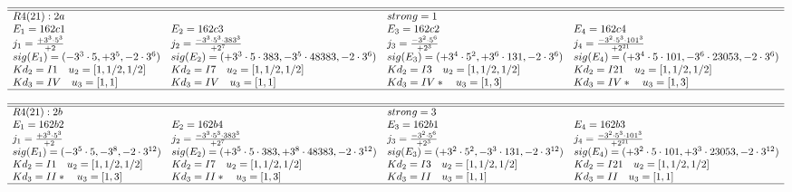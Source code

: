 \documentclass[11pt]{article}
\theoremstyle{definition}
\begin{document}
$$
 \begin{array}{llll}
 \hline 
\hline 
  R4(21):2a  &   & strong=1\\
 E_1=162c1 & E_2=162c3 & E_3=162c2 & E_4=162c4 \\
 j_1=\frac{+3^{3}\cdot 5^{3}}{+2} & j_2=\frac{-3^{3}\cdot 5^{3}\cdot 383^{3}}{+2^{7}} & j_3=\frac{-3^{2}\cdot 5^{6}}{+2^{3}} & j_4=\frac{-3^{2}\cdot 5^{3}\cdot 101^{3}}{+2^{21}} \\
 sig(E_1)=(-3^{3}\cdot 5,+3^{5},-2\cdot 3^{6}) & sig(E_2)=(+3^{3}\cdot 5\cdot 383,-3^{5}\cdot 48383,-2\cdot 3^{6}) & sig(E_3)=(+3^{4}\cdot 5^{2},+3^{6}\cdot 131,-2\cdot 3^{6}) & sig(E_4)=(+3^{4}\cdot 5\cdot 101,-3^{6}\cdot 23053,-2\cdot 3^{6}) \\
  Kd_{2}=I1\quad u_{2}=[ 1, 1/2, 1/2 ]&  Kd_{2}=I7\quad u_{2}=[ 1, 1/2, 1/2 ]&  Kd_{2}=I3\quad u_{2}=[ 1, 1/2, 1/2 ]&  Kd_{2}=I21\quad u_{2}=[ 1, 1/2, 1/2 ]\\
  Kd_{3}=IV\quad u_{3}=[ 1, 1 ]&  Kd_{3}=IV\quad u_{3}=[ 1, 1 ]&  Kd_{3}=IV*\quad u_{3}=[ 1, 3 ]&  Kd_{3}=IV*\quad u_{3}=[ 1, 3 ]\\
\hline
\end{array}
 $$


$$
 \begin{array}{llll}
 \hline 
\hline 
  R4(21):2b  &   & strong=3\\
 E_1=162b2 & E_2=162b4 & E_3=162b1 & E_4=162b3 \\
 j_1=\frac{+3^{3}\cdot 5^{3}}{+2} & j_2=\frac{-3^{3}\cdot 5^{3}\cdot 383^{3}}{+2^{7}} & j_3=\frac{-3^{2}\cdot 5^{6}}{+2^{3}} & j_4=\frac{-3^{2}\cdot 5^{3}\cdot 101^{3}}{+2^{21}} \\
 sig(E_1)=(-3^{5}\cdot 5,-3^{8},-2\cdot 3^{12}) & sig(E_2)=(+3^{5}\cdot 5\cdot 383,+3^{8}\cdot 48383,-2\cdot 3^{12}) & sig(E_3)=(+3^{2}\cdot 5^{2},-3^{3}\cdot 131,-2\cdot 3^{12}) & sig(E_4)=(+3^{2}\cdot 5\cdot 101,+3^{3}\cdot 23053,-2\cdot 3^{12}) \\
  Kd_{2}=I1\quad u_{2}=[ 1, 1/2, 1/2 ]&  Kd_{2}=I7\quad u_{2}=[ 1, 1/2, 1/2 ]&  Kd_{2}=I3\quad u_{2}=[ 1, 1/2, 1/2 ]&  Kd_{2}=I21\quad u_{2}=[ 1, 1/2, 1/2 ]\\
  Kd_{3}=II*\quad u_{3}=[ 1, 3 ]&  Kd_{3}=II*\quad u_{3}=[ 1, 3 ]&  Kd_{3}=II\quad u_{3}=[ 1, 1 ]&  Kd_{3}=II\quad u_{3}=[ 1, 1 ]\\
\hline
\end{array}
 $$
  
\end{document}
